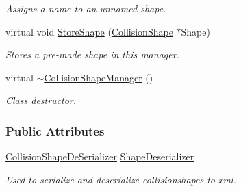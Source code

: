 \begin{DoxyCompactItemize}
\begin{DoxyCompactList}\small\item\em Assigns a name to an unnamed shape. \item\end{DoxyCompactList}\item 
virtual void \hyperlink{classMezzanine_1_1CollisionShapeManager_a9873202c93a5d70327219cc700948908}{StoreShape} (\hyperlink{classMezzanine_1_1CollisionShape}{CollisionShape} $\ast$Shape)
\begin{DoxyCompactList}\small\item\em Stores a pre-\/made shape in this manager. \item\end{DoxyCompactList}\item 
\hypertarget{classMezzanine_1_1CollisionShapeManager_aaa11539e5740540ec299c616b54556bf}{
virtual \hyperlink{classMezzanine_1_1CollisionShapeManager_aaa11539e5740540ec299c616b54556bf}{$\sim$CollisionShapeManager} ()}
\label{classMezzanine_1_1CollisionShapeManager_aaa11539e5740540ec299c616b54556bf}

\begin{DoxyCompactList}\small\item\em Class destructor. \item\end{DoxyCompactList}\end{DoxyCompactItemize}
\subsubsection*{Public Attributes}
\begin{DoxyCompactItemize}
\item 
\hyperlink{classMezzanine_1_1CollisionShapeDeSerializer}{CollisionShapeDeSerializer} \hyperlink{classMezzanine_1_1CollisionShapeManager_a4157bd3404ced58ce49a828e46e0c110}{ShapeDeserializer}
\begin{DoxyCompactList}\small\item\em Used to serialize and deserialize collisionshapes to xml. \item\end{DoxyCompactList}\end{DoxyCompactItemize}
